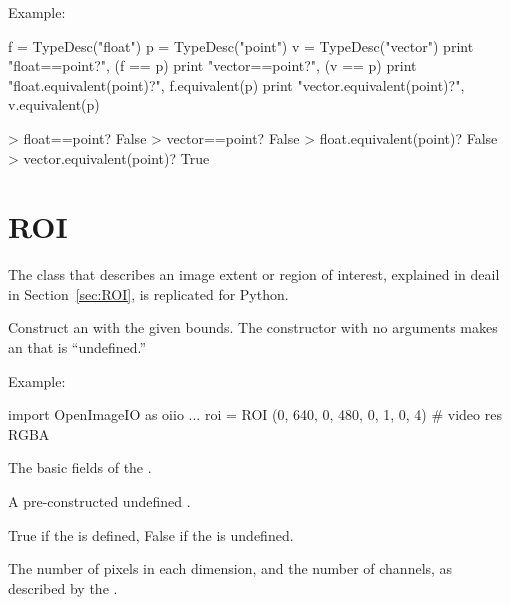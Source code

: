 \noindent Example:
\begin{code}
    f = TypeDesc("float")
    p = TypeDesc("point")
    v = TypeDesc("vector")
    print "float==point?", (f == p)
    print "vector==point?", (v == p)
    print "float.equivalent(point)?", f.equivalent(p)
    print "vector.equivalent(point)?", v.equivalent(p)

    > float==point? False
    > vector==point? False
    > float.equivalent(point)? False
    > vector.equivalent(point)? True
\end{code}
\apiend


\section{ROI}
\label{sec:pythonroi}

The \ROI class that describes an image extent or region of interest,
explained in deail in Section~\ref{sec:ROI}, is replicated for Python.

Construct an \ROI with the given bounds.  The constructor with no 
arguments makes an \ROI that is ``undefined.''

\noindent Example:
\begin{code}
    import OpenImageIO as oiio
    ...
    roi = ROI (0, 640, 0, 480, 0, 1, 0, 4)   # video res RGBA
\end{code}
\apiend

The basic fields of the \ROI.
\apiend

A pre-constructed undefined \ROI.
\apiend

{\cf True} if the \ROI is defined, {\cf False} if the \ROI is undefined.
\apiend

The number of pixels in each dimension, and the number of channels,
as described by the \ROI.
\apiend

